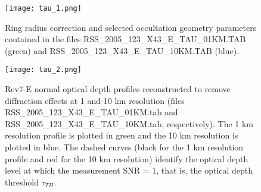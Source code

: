\documentclass[crop=false,class=book]{standalone}
\begin{document}
\begin{figure}[H]
    \centering
	\texttt{[image: tau\_1.png]}
	\caption[Even More Occultation Geometry]{Ring radius correction and selected occultation geometry parameters contained in the files RSS\_2005\_123\_X43\_E\_TAU\_01KM.TAB (green) and RSS\_2005\_123\_X43\_E\_TAU\_10KM.TAB (blue).}
\end{figure}
\clearpage
\begin{figure}[H]
  \centering
  \texttt{[image: tau\_2.png]}
  \caption[Normal Optical Depth Profiles from the Easy Data]{Rev7-E normal optical depth profiles reconstructed to remove diffraction effects at 1 and 10 km resolution (files RSS\_2005\_123\_X43\_E\_TAU\_01KM.tab and RSS\_2005\_123\_X43\_E\_TAU\_10KM.tab, respectively). The 1 km resolution profile is plotted in green and the 10 km resolution is plotted in blue. The dashed curves (black for the 1 km resolution profile and red for the 10 km resolution) identify the optical depth level at which the measurement SNR = 1, that is, the optical depth threshold $\tau_{TH}$.}
\end{figure}
\end{document}
